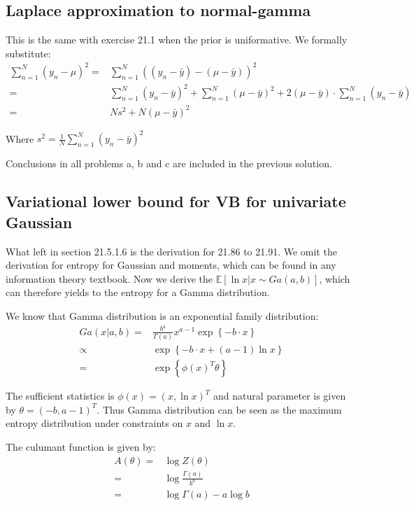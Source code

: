 \documentclass[UTF8]{ctexart}
\begin{document}
\subsection{Laplace approximation to normal-gamma}
This is the same with exercise 21.1 when the prior is uniformative. We formally substitute:
\begin{align}
\sum_{n=1}^{N}(y_{n}-\mu)^{2}=& \sum_{n=1}^{N}((y_{n}-\bar{y})-(\mu-\bar{y}))^{2} \nonumber \\
=&\sum_{n=1}^{N}(y_{n}-\bar{y})^{2} + \sum_{n=1}^{N}(\mu-\bar{y})^{2} + 2(\mu-\bar{y})\cdot\sum_{n=1}^{N}(y_{n}-\bar{y})\nonumber \\
=&Ns^{2}+N(\mu-\bar{y})^{2} \nonumber
\end{align}

Where $s^{2}=\frac{1}{N}\sum_{n=1}^{N}(y_{n}-\bar{y})^{2}$

Conclusions in all problems a, b and c are included in the previous solution.

\subsection{Variational lower bound for VB for univariate Gaussian}
What left in section 21.5.1.6 is the derivation for 21.86 to 21.91. We omit the derivation for entropy for Gaussian and moments, which can be found in any information theory textbook. Now we derive the $\mathbb{E}[\ln x|x \sim Ga(a,b)]$, which can therefore yields to the entropy for a Gamma distribution.

We know that Gamma distribution is an exponential family distribution:
\begin{align}
Ga(x|a,b)=&\frac{b^{a}}{\Gamma(a)}x^{a-1}\exp\left\{-b\cdot x \right\}\nonumber \\
\propto& \exp\left\{-b\cdot x+(a-1) \ln x  \right\} \nonumber\\
=&\exp\left\{ \phi(x)^{T}\theta \right\}\nonumber
\end{align}

The sufficient statistics is $\phi(x)=(x,\ln x)^{T}$ and natural parameter is given by $\theta = (-b,a-1)^{T}$. Thus Gamma distribution can be seen as the maximum entropy distribution under constraints on $x$ and $\ln x$.

The culumant function is given by:
\begin{align}
A(\theta)=& \log Z(\theta)\nonumber \\
=&\log \frac{\Gamma(a)}{b^{a}} \nonumber \\
=&\log \Gamma(a) - a \log b \nonumber
\end{align}
\end{document}
